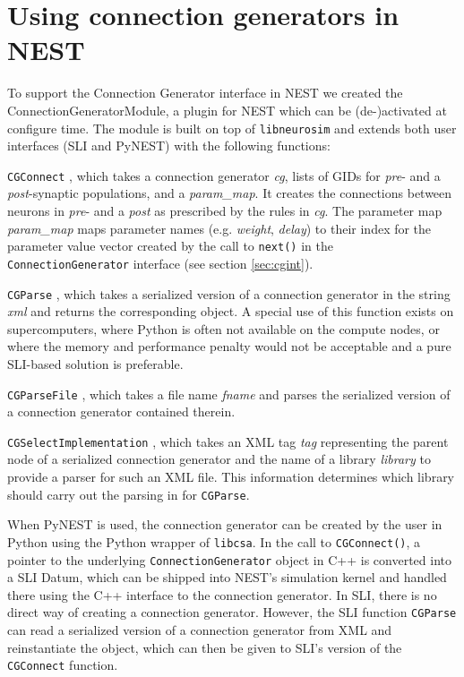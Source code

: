 \documentclass{frontiersSCNS} %
\begin{document}
\section{Using connection generators in NEST}\label{sec:conn_gen_nest}

To support the Connection Generator interface in NEST we created the
ConnectionGeneratorModule, a plugin for NEST which can be
(de-)activated at configure time. The module is built on top of
\verb|libneurosim| and extends both user interfaces (SLI and PyNEST)
with the following functions:

\begin{unlist}
\item[\tt CGConnect], which takes a connection generator \emph{cg},
  lists of GIDs for \emph{pre}- and a \emph{post}-synaptic
  populations, and a \emph{param\_map}. It creates the connections
  between neurons in \emph{pre}- and a \emph{post} as prescribed by
  the rules in \emph{cg}. The parameter map \emph{param\_map} maps
  parameter names (e.g. \emph{weight}, \emph{delay}) to their index
  for the parameter value vector created by the call to \verb|next()|
  in the \verb|ConnectionGenerator| interface (see section
  \ref{sec:cgint}).
\item[\tt CGParse], which takes a serialized version of a connection
  generator in the string \emph{xml} and returns the corresponding
  object. A special use of this function exists on supercomputers,
  where Python is often not available on the compute nodes, or where
  the memory and performance penalty would not be acceptable and a
  pure SLI-based solution is preferable.
\item[\tt CGParseFile], which takes a file name \emph{fname} and parses
  the serialized version of a connection generator contained therein.
\item[\tt CGSelectImplementation], which takes an XML tag \emph{tag}
  representing the parent node of a serialized connection generator
  and the name of a library \emph{library} to provide a parser for
  such an XML file. This information determines which library should
  carry out the parsing in for \verb|CGParse|.
\end{unlist}

When PyNEST is used, the connection generator can be created by the
user in Python using the Python wrapper of \verb|libcsa|. In the call
to \verb|CGConnect()|, a pointer to the underlying
\verb|ConnectionGenerator| object in C++ is converted into a SLI
Datum, which can be shipped into NEST's simulation kernel and handled
there using the C++ interface to the connection generator. In SLI,
there is no direct way of creating a connection generator. However,
the SLI function \verb|CGParse| can read a serialized version of a
connection generator from XML and reinstantiate the object, which can
then be given to SLI's version of the \verb|CGConnect| function.
\end{document}
